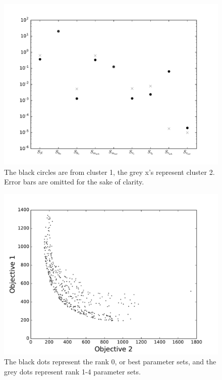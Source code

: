 \documentclass[fleqn,10pt]{wlscirep}
\begin{document}
\begin{figure}[ht]
       \centering
       \includegraphics[width=\linewidth]{figures/MultiobjectiveSenstivityGraph10familiesofNoErrorBarsJun22}
       \caption{The black circles are from cluster 1, the grey x's represent cluster 2. Error bars are omitted for the sake of clarity.}
        \label{fig:MultiobjectiveSensitivityGraph}
\end{figure} 
\begin{figure}[ht]
       \centering
       \includegraphics[width=\linewidth]{figures/TradeOffCurveFasterCooling}
       \caption{The black dots represent the rank 0, or best parameter sets, and the grey dots represent rank 1-4 parameter sets.}
       \label{fig:tradeoffcurve}
\end{figure}
\end{document}

